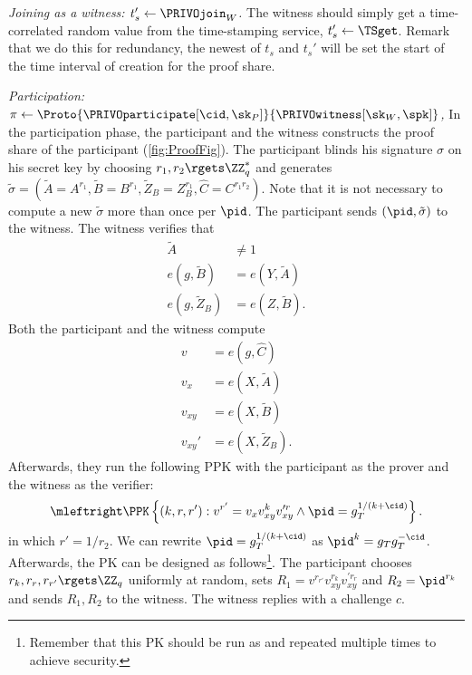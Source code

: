\emph{Joining as a witness: \(t_s'\gets \PRIVOjoin_W\).}
The witness should simply get a time-correlated random value from the time-stamping service, \(t_s'\gets \TSget\).
Remark that we do this for redundancy, the newest of \(t_s\) and \(t_s'\) will be set the start of the time interval of creation for the proof share.


\emph{Participation: \(\pi\gets
    \Proto{\PRIVOparticipate[\cid, \sk_P]}{\PRIVOwitness[\sk_W, \spk]}\),}
In the participation phase, the participant and the witness constructs the proof share of the participant (\cref{fig:ProofFig}).
The participant blinds his signature \(\sigma\) on his secret key by choosing \(r_1, r_2\rgets \ZZ_q^*\) and generates \(
  \tilde\sigma = (\tilde A = A^{r_1},
                  \tilde B = B^{r_1},
                  \tilde Z_B = Z_B^{r_1},
                  \hat C = C^{r_1 r_2}).
\) 
Note that it is not necessary to compute a new \(\tilde\sigma\) more than once per \(\pid\).
The participant sends \((\pid, \tilde\sigma)\) to the witness.
The witness verifies that
\begin{align*}
  \tilde A          &\neq 1 \\
  e(g, \tilde B)    &= e(Y, \tilde A) \\
  e(g, \tilde Z_B)  &= e(Z, \tilde B).
\end{align*}
Both the participant and the witness compute
\begin{align*}
  v &= e(g, \hat C) \\
  v_x &= e(X, \tilde A) \\
  v_{xy} &= e(X, \tilde B) \\
  v_{xy}' &= e(X, \tilde Z_B).
\end{align*}
Afterwards, they run the following \ac{PPK} with the participant as the prover and the witness as the verifier:
\begin{multline*}
  \mleftright
  \PPK\left\{(k, r, r') : v^{r'} = v_x v_{xy}^k v_{xy}^{\prime r} \land
    \pid = g_T^{1/(k+\cid)} \right\}.
\end{multline*}
in which \(r' = 1/r_2\).
We can rewrite \(\pid = g_T^{1/(k+\cid)}\) as \(\pid^k = g_T g_T^{-\cid}\).
Afterwards, the \ac{PK} can be designed as follows\footnote{Remember that this \ac{PK} should be run as  and repeated multiple times to achieve security.}.
The participant chooses \(r_k, r_r, r_{r'}\rgets \ZZ_q\) uniformly at random, sets \(R_1 = v^{r_{r'}} v_{xy}^{r_k} v_{xy}^{\prime r_r}\) and \(R_2 = \pid^{r_k}\) and sends \(R_1, R_2\) to the witness.
The witness replies with a challenge \(c\).
